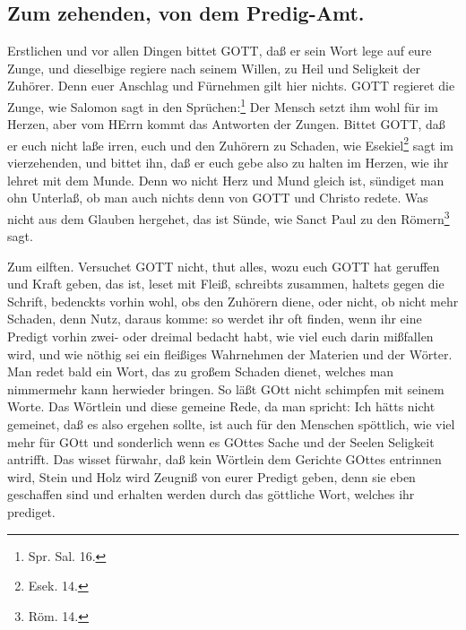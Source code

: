 \subsection*{Zum zehenden, von dem Predig-Amt.}
%

Erstlichen und vor allen Dingen bittet GOTT, daß er sein Wort lege auf eure Zunge, und dieselbige regiere nach seinem Willen, zu Heil und Seligkeit der Zuhörer. Denn euer Anschlag und Fürnehmen gilt hier nichts. GOTT regieret die Zunge, wie Salomon sagt in den Sprüchen:\footnote{Spr. Sal. 16.} Der Mensch setzt ihm wohl für im Herzen, aber vom HErrn kommt das Antworten der Zungen. Bittet GOTT, daß er euch nicht laße irren, euch und den Zuhörern zu Schaden, wie Esekiel\footnote{Esek. 14.} sagt im vierzehenden, und bittet ihn, daß er euch gebe also zu halten im Herzen, wie ihr lehret mit dem Munde. Denn wo nicht Herz und Mund gleich ist, sündiget man ohn Unterlaß, ob man auch nichts denn von GOTT und Christo redete. Was nicht aus dem Glauben hergehet, das ist Sünde, wie Sanct Paul zu den Römern\footnote{Röm. 14.} sagt.

Zum eilften. Versuchet GOTT nicht, thut alles, wozu euch GOTT hat geruffen und Kraft geben, das ist, leset mit Fleiß, schreibts zusammen, haltets gegen die Schrift, bedenckts vorhin wohl, obs den Zuhörern diene, oder
nicht, ob nicht mehr Schaden, denn Nutz, daraus komme: so werdet ihr oft finden, wenn ihr eine Predigt vorhin zwei- oder dreimal bedacht habt, wie viel euch darin mißfallen wird, und wie nöthig sei ein fleißiges Wahrnehmen der Materien und der Wörter. Man redet bald ein Wort, das zu großem Schaden dienet, welches man nimmermehr kann herwieder bringen. So läßt GOtt nicht schimpfen mit seinem Worte. Das Wörtlein und diese gemeine Rede, da man spricht: Ich hätts nicht gemeinet, daß es also ergehen sollte, ist auch für den Menschen spöttlich, wie viel mehr für GOtt und sonderlich wenn es GOttes Sache und der Seelen Seligkeit antrifft. Das wisset fürwahr, daß kein Wörtlein dem Gerichte GOttes entrinnen wird, Stein und Holz wird Zeugniß von eurer Predigt geben, denn sie eben geschaffen sind und erhalten werden durch das göttliche Wort, welches ihr prediget.

